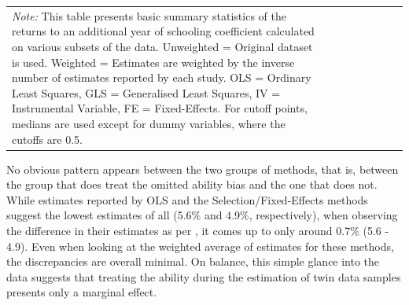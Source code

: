 \begin{table}[!t]
\begin{tabular}{
    @{}
    l %
    *{6}{c} %
    >{\centering\arraybackslash}p{1cm} %
    @{}
    }
    \bottomrule

    \multicolumn{8}{>{\scriptsize}p{0.85\linewidth}}{\emph{Note:} This table presents basic summary statistics of the returns to an additional year of schooling coefficient calculated on various subsets of the data. Unweighted = Original dataset is used. Weighted = Estimates are weighted by the inverse number of estimates reported by each study. OLS = Ordinary Least Squares, GLS = Generalised Least Squares, IV = Instrumental Variable, FE = Fixed-Effects. For cutoff points, medians are used except for dummy variables, where the cutoffs are 0.5.}
  \end{tabular}
\end{table}

No obvious pattern appears between the two groups of methods, that is, between the group that does treat the omitted ability bias and the one that does not. While estimates reported by \ac{OLS} and the Selection/Fixed-Effects methods suggest the lowest estimates of all (5.6\% and 4.9\%, respectively), when observing the difference in their estimates as per \cite{li2012estimating}, it comes up to only around 0.7\% (5.6 - 4.9). Even when looking at the weighted average of estimates for these methods, the discrepancies are overall minimal. On balance, this simple glance into the data suggests that treating the ability during the estimation of twin data samples presents only a marginal effect.



